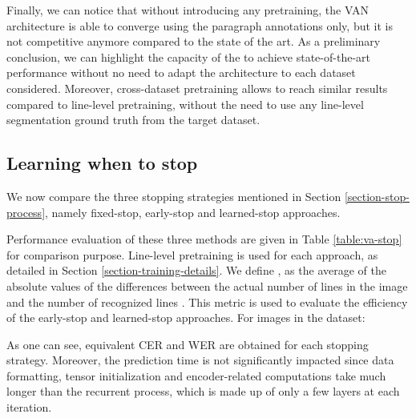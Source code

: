 Finally, we can notice that without introducing any pretraining, the VAN architecture is able to converge using the paragraph annotations only, but it is not competitive anymore compared to the state of the art.
As a preliminary conclusion, we can highlight the capacity of the \modelacc{} to achieve state-of-the-art performance without no need to adapt the architecture to each dataset considered. Moreover, cross-dataset pretraining allows to reach similar results compared to line-level pretraining, without the need to use any line-level segmentation ground truth from the target dataset.


\subsection{Learning when to stop}
\label{section-exp-stop}
We now compare the three stopping strategies mentioned in Section \ref{section-stop-process}, namely fixed-stop, early-stop and learned-stop approaches.

Performance evaluation of these three methods are given in Table \ref{table:va-stop} for comparison purpose. Line-level pretraining is used for each approach, as detailed in Section \ref{section-training-details}. 
We define , as the average of the absolute values of the differences between the actual number of lines in the image  and the number of recognized lines . This metric is used to evaluate the efficiency of the early-stop and learned-stop approaches. For  images in the dataset:




As one can see, equivalent CER and WER are obtained for each stopping strategy. Moreover, the prediction time is not significantly impacted since data formatting, tensor initialization and encoder-related computations take much longer than the recurrent process, which is made up of only a few layers at each iteration.

\begin{table}[!h]
    \caption{Comparison between fixed-stop, early-stop and learned-stop approaches with the \modelacc{} on the test set of the IAM dataset.}
    \centering
    \label{table:va-stop}
\end{table}

